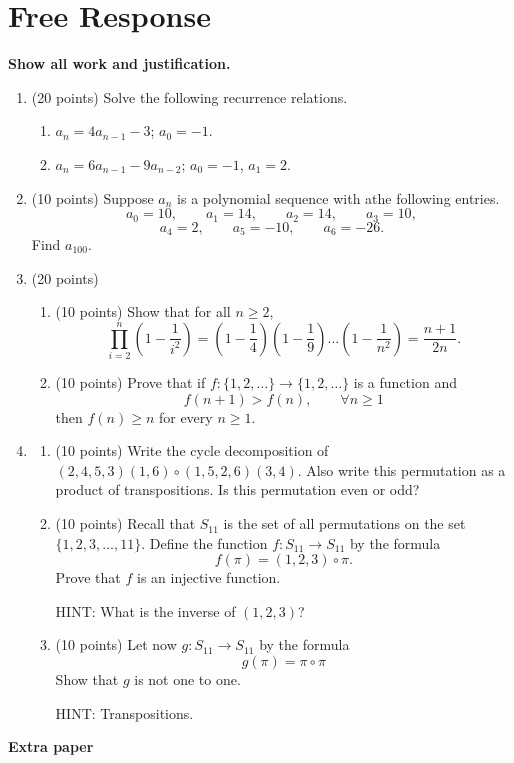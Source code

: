 \documentclass[12pt]{article}
\begin{document}
\section*{Free Response}

\textbf{Show all work and justification.} 

\begin{enumerate}
\item (20 points) Solve the following recurrence relations.
\begin{enumerate}
\item $a_n=4a_{n-1}-3$; $a_0=-1$.
\item $a_n=6a_{n-1}-9a_{n-2}$; $a_0=-1$, $a_1=2$.
\end{enumerate}
\newpage
\item (10 points) Suppose $a_n$ is a polynomial sequence with athe following entries.
\[
a_0=10,\qquad a_1=14,\qquad a_2=14,\qquad
a_3=10,
\]
\[
a_4=2,\qquad
a_5=-10,\qquad
a_6=-26.
\]
Find $a_{100}$.
\newpage 
\item (20 points)
\begin{enumerate}
\item (10 points) Show that for all $n\geq 2$,
\[
\prod_{i=2}^{n}\left(1-\frac{1}{i^2}\right)=\left(1-\frac{1}{4}\right)\left(1-\frac{1}{9}\right)\dots\left(1-\frac{1}{n^2}\right)=\frac{n+1}{2n}.
\]
\item (10 points) Prove that if $f:\{1,2,\dots\}\to \{1,2,\dots\}$ is a function and
\[
f(n+1)>f(n),\qquad\forall n\geq 1
\]
then $f(n)\geq n$ for every $n\geq 1$.
\end{enumerate}
\newpage
\item 
\begin{enumerate}
\item (10 points) Write the cycle decomposition of $(2,4,5,3)(1,6)\circ (1,5,2,6)(3,4)$. Also write this permutation as a product of transpositions. Is this permutation even or odd?

\item (10 points) Recall that $S_{11}$ is the set of all permutations on the set $\{1,2,3,\dots,11\}$. Define the function $f:S_{11}\to S_{11}$ by the formula
\[
f(\pi)=(1,2,3)\circ\pi.
\]
Prove that $f$ is an injective function.

HINT: What is the inverse of $(1,2,3)$?

\item (10 points) Let now $g:S_{11}\to S_{11}$ by the formula
\[
g(\pi)=\pi\circ\pi
\]
Show that $g$ is not one to one. 

HINT: Transpositions.
\end{enumerate}

\end{enumerate}

\newpage
\noindent
\textbf{Extra paper}
%

%
\end{document}

